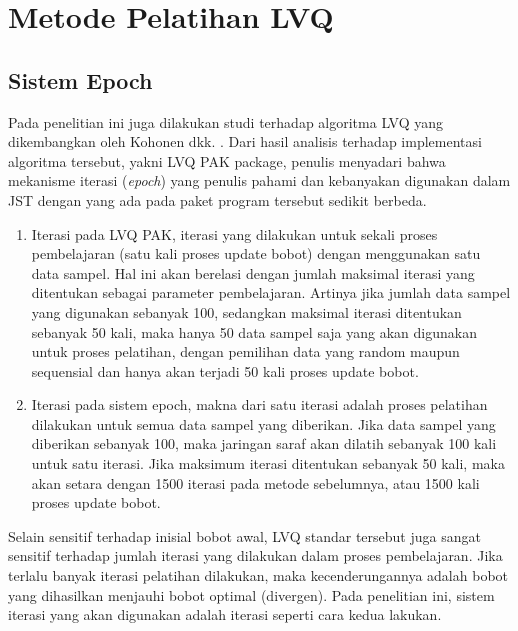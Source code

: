 \section{Metode Pelatihan LVQ}
\subsection{Sistem Epoch}
Pada penelitian ini juga dilakukan studi terhadap algoritma LVQ yang
dikembangkan oleh Kohonen dkk. \cite{Kohonen92lvqpak}. Dari hasil analisis
terhadap implementasi algoritma tersebut, yakni LVQ PAK package, penulis
menyadari bahwa mekanisme iterasi (\emph{epoch}) yang penulis pahami dan
kebanyakan digunakan dalam JST dengan yang ada pada paket program  tersebut
sedikit berbeda.
\begin{enumerate}
  \item Iterasi pada LVQ PAK, iterasi yang dilakukan untuk sekali proses
  pembelajaran (satu kali proses update bobot) dengan menggunakan satu data
  sampel. Hal ini akan berelasi dengan jumlah maksimal iterasi yang ditentukan
  sebagai parameter pembelajaran. Artinya jika jumlah data sampel yang digunakan
  sebanyak 100, sedangkan maksimal iterasi ditentukan sebanyak 50 kali, maka
  hanya 50 data sampel saja yang akan digunakan untuk proses pelatihan, dengan
  pemilihan data yang random maupun sequensial dan hanya akan terjadi 50 kali
  proses update bobot.
  \item Iterasi pada sistem epoch, makna dari satu iterasi adalah
  proses pelatihan dilakukan untuk semua data sampel yang diberikan. Jika data
  sampel yang diberikan sebanyak 100, maka jaringan saraf akan dilatih sebanyak
  100 kali untuk satu iterasi. Jika maksimum iterasi ditentukan sebanyak 50
  kali, maka akan setara dengan 1500 iterasi pada metode sebelumnya, atau 1500
  kali proses update bobot.
\end{enumerate}

Selain sensitif terhadap inisial bobot awal, LVQ standar tersebut juga sangat
sensitif terhadap jumlah iterasi yang dilakukan dalam proses pembelajaran. Jika
terlalu banyak iterasi pelatihan dilakukan, maka kecenderungannya adalah bobot
yang dihasilkan menjauhi bobot optimal (divergen)\cite{Sato:1995}.  Pada
penelitian ini, sistem iterasi yang akan digunakan adalah iterasi seperti cara
kedua lakukan.
% 
% 

